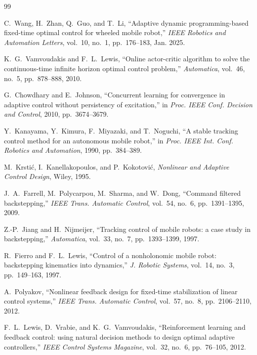 \documentclass[12pt,a4paper]{article}
\begin{document}
\newpage
{}
\begin{thebibliography}{99}

C.~Wang, H.~Zhan, Q.~Guo, and T.~Li,
``Adaptive dynamic programming-based fixed-time optimal control for wheeled mobile robot,''
\textit{IEEE Robotics and Automation Letters}, vol.~10, no.~1, pp.~176--183, Jan. 2025.

K.~G.~Vamvoudakis and F.~L.~Lewis,
``Online actor-critic algorithm to solve the continuous-time infinite horizon optimal control problem,''
\textit{Automatica}, vol.~46, no.~5, pp.~878--888, 2010.

G.~Chowdhary and E.~Johnson,
``Concurrent learning for convergence in adaptive control without persistency of excitation,''
in \textit{Proc. IEEE Conf. Decision and Control}, 2010, pp.~3674--3679.

Y.~Kanayama, Y.~Kimura, F.~Miyazaki, and T.~Noguchi,
``A stable tracking control method for an autonomous mobile robot,''
in \textit{Proc. IEEE Int. Conf. Robotics and Automation}, 1990, pp.~384--389.

M.~Krstić, I.~Kanellakopoulos, and P.~Kokotović,
\textit{Nonlinear and Adaptive Control Design},
Wiley, 1995.

J.~A.~Farrell, M.~Polycarpou, M.~Sharma, and W.~Dong,
``Command filtered backstepping,''
\textit{IEEE Trans. Automatic Control}, vol.~54, no.~6, pp.~1391--1395, 2009.

Z.-P.~Jiang and H.~Nijmeijer,
``Tracking control of mobile robots: a case study in backstepping,''
\textit{Automatica}, vol.~33, no.~7, pp.~1393--1399, 1997.

R.~Fierro and F.~L.~Lewis,
``Control of a nonholonomic mobile robot: backstepping kinematics into dynamics,''
\textit{J. Robotic Systems}, vol.~14, no.~3, pp.~149--163, 1997.

A.~Polyakov,
``Nonlinear feedback design for fixed-time stabilization of linear control systems,''
\textit{IEEE Trans. Automatic Control}, vol.~57, no.~8, pp.~2106--2110, 2012.

F.~L.~Lewis, D.~Vrabie, and K.~G.~Vamvoudakis,
``Reinforcement learning and feedback control: using natural decision methods to design optimal adaptive controllers,''
\textit{IEEE Control Systems Magazine}, vol.~32, no.~6, pp.~76--105, 2012.


\end{thebibliography}
\end{document}
